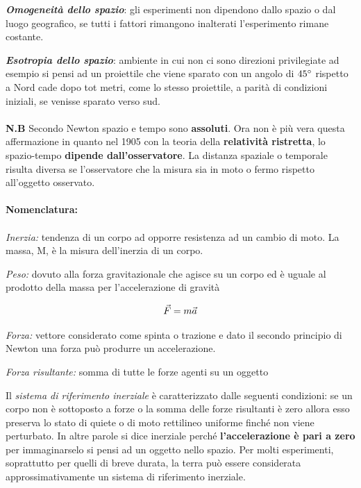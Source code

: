 \textbf{\textit{Omogeneità dello spazio}}: gli esperimenti non dipendono dallo spazio o dal luogo geografico, se tutti i fattori rimangono inalterati l’esperimento rimane costante. 

\textbf{\textit{Esotropia dello spazio}}: ambiente in cui non ci sono direzioni privilegiate ad esempio si pensi ad un proiettile che viene sparato con un angolo di $45^\circ$ rispetto a Nord cade dopo tot metri, come lo stesso proiettile, a parità di condizioni iniziali, se venisse sparato verso sud.

\paragraph{}

\textbf{N.B} Secondo Newton spazio e tempo sono \textbf{assoluti}. Ora non è più vera questa affermazione in quanto nel 1905 con la teoria della \textbf{relatività ristretta}, lo spazio-tempo \textbf{dipende dall'osservatore}. La distanza spaziale o temporale risulta diversa se l'osservatore che la misura sia in moto o fermo rispetto all'oggetto osservato.

\newpage
\paragraph{Nomenclatura:}
\paragraph{}
\textit{Inerzia:} tendenza di un corpo ad opporre resistenza ad un cambio di moto. La massa, M, è la misura dell’inerzia di un corpo.

\textit{Peso:} dovuto alla forza gravitazionale che agisce su un corpo ed è uguale al prodotto della massa per l’accelerazione di gravità 

\begin{equation*}
    \vec{F} = m\vec{a}
\end{equation*}

\textit{Forza:} vettore considerato come spinta o trazione e dato il secondo principio di Newton una forza può produrre un accelerazione. 

\textit{Forza risultante:} somma di tutte le forze agenti su un oggetto 


Il \textit{sistema di riferimento inerziale} è caratterizzato dalle seguenti condizioni: se un corpo non è sottoposto a forze o la somma delle forze risultanti è zero allora esso preserva lo stato di quiete o di moto rettilineo uniforme finché non viene perturbato. In altre parole si dice inerziale perché \textbf{l’accelerazione è pari a zero} per immaginarselo si pensi ad un oggetto nello spazio. 
Per molti esperimenti, soprattutto per quelli di breve durata, la terra può essere considerata approssimativamente un sistema di riferimento inerziale. 

